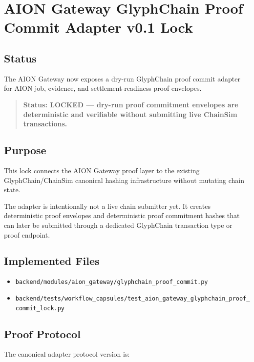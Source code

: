 \section{AION Gateway GlyphChain Proof Commit Adapter v0.1 Lock}
\label{sec:aion-gateway-glyphchain-proof-commit-lock}

\subsection{Status}

The AION Gateway now exposes a dry-run GlyphChain proof commit adapter for AION job, evidence, and settlement-readiness proof envelopes.

\begin{quote}
\textbf{Status: LOCKED --- dry-run proof commitment envelopes are deterministic and verifiable without submitting live ChainSim transactions.}
\end{quote}

\subsection{Purpose}

This lock connects the AION Gateway proof layer to the existing GlyphChain/ChainSim canonical hashing infrastructure without mutating chain state.

The adapter is intentionally not a live chain submitter yet. It creates deterministic proof envelopes and deterministic proof commitment hashes that can later be submitted through a dedicated GlyphChain transaction type or proof endpoint.

\subsection{Implemented Files}

\begin{itemize}
  \item \texttt{backend/modules/aion\_gateway/glyphchain\_proof\_commit.py}
  \item \texttt{backend/tests/workflow\_capsules/test\_aion\_gateway\_glyphchain\_proof\_commit\_lock.py}
\end{itemize}

\subsection{Proof Protocol}

The canonical adapter protocol version is:

